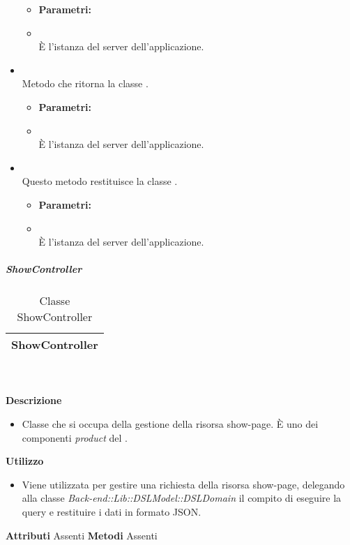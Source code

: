 \begin{itemize}
\begin{itemize}
\item[] \textbf{Parametri:}
\item[]  \\ È l'istanza del server dell'applicazione.
\end{itemize}
\item[] \textbf{} \\ Metodo che ritorna la classe .
\begin{itemize}\addtolength{\itemsep}{-0.5\baselineskip}
\item[] \textbf{Parametri:}
\item[]  \\ È l'istanza del server dell'applicazione.
\end{itemize}
\item[] \textbf{} \\ Questo metodo restituisce la classe .
\begin{itemize}\addtolength{\itemsep}{-0.5\baselineskip}
\item[] \textbf{Parametri:}
\item[]  \\ È l'istanza del server dell'applicazione.
\end{itemize}
\end{itemize}

			\subparagraph{ShowController} 
\begin{table}[ht]
\begin{center}
\bgroup
	\setlength{\arrayrulewidth}{0.6mm}
	\def\arraystretch{1}
		\begin{tabular}{ | p{12cm} | }
				\hline  
					\centerline{\textbf{ShowController}}
		\\ \hline 
				\hline
				\hline
		
		\end{tabular}
\egroup
\caption{Classe ShowController}
\end{center}
\end{table} \textbf{\\ \\ Descrizione}
\begin{itemize}
\item[] Classe che si occupa della gestione della risorsa show-page. È uno dei componenti \textit{product} del  .
\end{itemize} 
\textbf{Utilizzo}
\begin{itemize}
\item[] Viene utilizzata per gestire una richiesta della risorsa show-page, delegando alla classe \textit{Back-end::Lib::DSLModel::DSLDomain} il compito di eseguire la query e restituire i dati in formato JSON.
\end{itemize}
\textbf{Attributi}
Assenti
\textbf{Metodi}
Assenti

